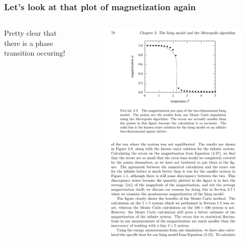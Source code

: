 \documentclass[hyperref={colorlinks=true}]{beamer}
\begin{document}

\begin{frame}%
  \frametitle{Let's look at that plot of magnetization again}

  \begin{columns}
  
 
  Pretty clear that there is a phase transition occuring!
  
  \vspace{0.5cm}
  
  
  \begin{figure}
    \includegraphics[width=\columnwidth]{2DIsing-Simulation-Magnetization.pdf}
  \end{figure}
  \end{columns}

  
\end{frame}
\end{document}
